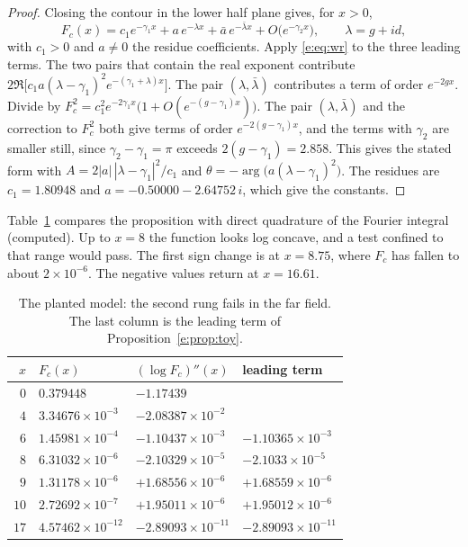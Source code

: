 \begin{proof}
Closing the contour in the lower half plane gives, for $x>0$,
\[
F_c(x)=c_1e^{-\gamma_1x}+a\,e^{-\lambda x}+\bar a\,e^{-\bar\lambda x}+O\big(e^{-\gamma_2x}\big),\qquad\lambda=g+id,
\]
with $c_1>0$ and $a\ne0$ the residue coefficients. Apply \eqref{e:eq:wr} to the three leading terms. The two pairs that contain the real exponent contribute $2\Re\big[c_1a(\lambda-\gamma_1)^2e^{-(\gamma_1+\lambda)x}\big]$. The pair $(\lambda,\bar\lambda)$ contributes a term of order $e^{-2gx}$. Divide by $F_c^2=c_1^2e^{-2\gamma_1x}\big(1+O(e^{-(g-\gamma_1)x})\big)$. The pair $(\lambda,\bar\lambda)$ and the correction to $F_c^2$ both give terms of order $e^{-2(g-\gamma_1)x}$, and the terms with $\gamma_2$ are smaller still, since $\gamma_2-\gamma_1=\pi$ exceeds $2(g-\gamma_1)=2.858$. This gives the stated form with $A=2|a|\,|\lambda-\gamma_1|^2/c_1$ and $\theta=-\arg\big(a(\lambda-\gamma_1)^2\big)$. The residues are $c_1=1.80948$ and $a=-0.50000-2.64752\,i$, which give the constants.
\end{proof}

Table~\ref{e:tab:toy} compares the proposition with direct quadrature of the Fourier integral (computed). Up to $x=8$ the function looks log concave, and a test confined to that range would pass. The first sign change is at $x=8.75$, where $F_c$ has fallen to about $2\times10^{-6}$. The negative values return at $x=16.61$.

\begin{table}[ht]
\centering\small
\caption{The planted model: the second rung fails in the far field. The last column is the leading term of Proposition~\ref{e:prop:toy}.}\label{e:tab:toy}
\begin{tabular}{@{}rlll@{}}
\toprule
$x$ & $F_c(x)$ & $(\log F_c)''(x)$ & leading term\\
\midrule
$0$ & $0.379448$ & $-1.17439$ & \\
$4$ & $3.34676\times10^{-3}$ & $-2.08387\times10^{-2}$ & \\
$6$ & $1.45981\times10^{-4}$ & $-1.10437\times10^{-3}$ & $-1.10365\times10^{-3}$\\
$8$ & $6.31032\times10^{-6}$ & $-2.10329\times10^{-5}$ & $-2.1033\times10^{-5}$\\
$9$ & $1.31178\times10^{-6}$ & $+1.68556\times10^{-6}$ & $+1.68559\times10^{-6}$\\
$10$ & $2.72692\times10^{-7}$ & $+1.95011\times10^{-6}$ & $+1.95012\times10^{-6}$\\
$17$ & $4.57462\times10^{-12}$ & $-2.89093\times10^{-11}$ & $-2.89093\times10^{-11}$\\
\bottomrule
\end{tabular}
\end{table}

